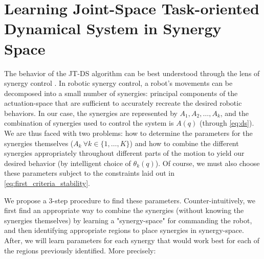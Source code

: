 \documentclass[letterpaper, 10 pt, conference,fleqn]{ieeeconf}
\begin{document}

\section{Learning \textbf{J}oint-Space \textbf{T}ask-oriented \textbf{D}ynamical \textbf{S}ystem in Synergy Space} 
\label{Sec:Learning}

The behavior of the JT-DS algorithm can be best understood through the lens of synergy control \cite{petrivc2013muscle}. In robotic synergy control, a robot's movements can be decomposed into a small number of synergies: principal components of the actuation-space that are sufficient to accurately recreate the desired robotic behaviors. In our case, the synergies are represented by $A_1, A_2, \dots, A_k$, and the combination of synergies used to control the system is $A(q)$ (through \eqref{eq:ds}). We are thus faced with two problems: how to determine the parameters for the synergies themselves ($A_k~\forall k\in\{1,\dots,K\}$) and how to combine the different synergies appropriately throughout different parts of the motion to yield our desired behavior (by intelligent choice of $\theta_k(q)$). Of course, we must also choose these parameters subject to the constraints laid out in \eqref{eq:first_criteria_stability}.

We propose a 3-step procedure to find these parameters. Counter-intuitively, we first find an appropriate way to combine the synergies (without knowing the synergies themselves) by learning a "synergy-space" for commanding the robot, and then identifying appropriate regions to place synergies in synergy-space. After, we will learn parameters for each synergy that would work best for each of the regions previously identified. More precisely:
\end{document}
